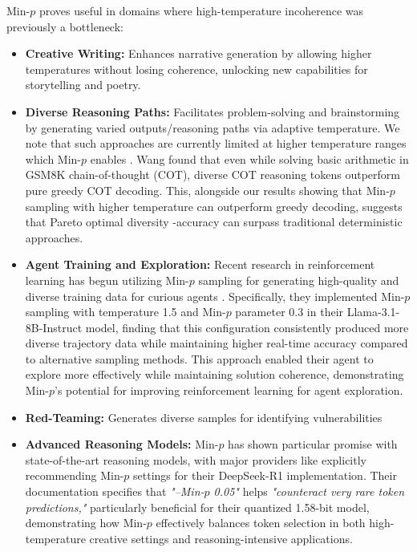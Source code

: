 \documentclass{article}
\begin{document}
Min-\(p\) proves useful in domains where high-temperature incoherence was previously a bottleneck:

\begin{itemize}
    \item \textbf{Creative Writing:} Enhances narrative generation by allowing higher temperatures without losing coherence, unlocking new capabilities for storytelling and poetry.
    \item \textbf{Diverse Reasoning Paths:} Facilitates problem-solving and brainstorming by generating varied outputs/reasoning paths via adaptive temperature. We note that such approaches are currently limited at higher temperature ranges which Min-\(p\) enables \cite{dhuliawala2024adaptivedecodinglatentpreference,xjdr2024entropix,zhang2024edtimprovinglargelanguage}. Wang \cite{wang2024chainofthoughtreasoningprompting} found that even while solving basic arithmetic in GSM8K chain-of-thought (COT), diverse COT reasoning tokens outperform pure greedy COT decoding. This, alongside our results showing that Min-\(p\) sampling with higher temperature can outperform greedy decoding, suggests that Pareto optimal diversity -accuracy can surpass traditional deterministic approaches.
    \item \textbf{Agent Training and Exploration:} Recent research in reinforcement learning has begun utilizing Min-\(p\) sampling for generating high-quality and diverse training data for curious agents \citep{tajwar2025traininggenerallycuriousagent}. Specifically, they implemented Min-\(p\) sampling with temperature 1.5 and Min-\(p\) parameter 0.3 in their Llama-3.1-8B-Instruct model, finding that this configuration consistently produced more diverse trajectory data while maintaining higher real-time accuracy compared to alternative sampling methods. This approach enabled their agent to explore more effectively while maintaining solution coherence, demonstrating Min-\(p\)'s potential for improving reinforcement learning for agent exploration.
    \item \textbf{Red-Teaming:} Generates diverse samples for identifying vulnerabilities\citep{anurin2024catastrophiccybercapabilitiesbenchmark}
    \item \textbf{Advanced Reasoning Models:} Min-\(p\) has shown particular promise with state-of-the-art reasoning models, with major providers like \cite{unsloth2025deepseekr1gguf} explicitly recommending Min-\(p\) settings for their DeepSeek-R1 implementation. Their documentation specifies that \textit{"--Min-\(p\) 0.05"} helps \textit{"counteract very rare token predictions,"} particularly beneficial for their quantized 1.58-bit model, demonstrating how Min-\(p\) effectively balances token selection in both high-temperature creative settings and reasoning-intensive applications.
\end{itemize}
\end{document}
